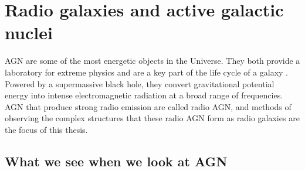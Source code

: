 \documentclass[11pt, a4paper]{book}
\begin{document}
\section{Radio galaxies and active galactic nuclei}
\label{sec:agn}

    AGN are some of the most energetic objects in the Universe. They both provide a laboratory for extreme physics and are a key part of the life cycle of a galaxy \citep{heckman_coevolution_2014}. Powered by a supermassive black hole, they convert gravitational potential energy into intense electromagnetic radiation at a broad range of frequencies. AGN that produce strong radio emission are called radio AGN, and methods of observing the complex structures that these radio AGN form as radio galaxies are the focus of this thesis.

    \subsection{What we see when we look at AGN}
    \label{sec:what-we-see-agn}
\end{document}
